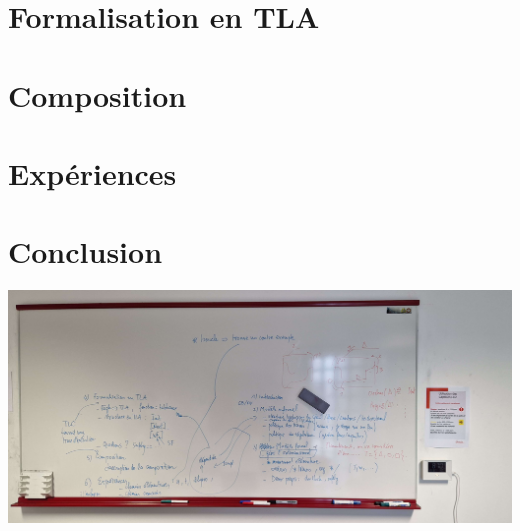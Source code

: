 \documentclass[runningheads]{llncs}
\begin{document}
\section{Formalisation en TLA}
\label{sec:tla-formalisation}

\section{Composition}
\label{sec:composition}

\section{Expériences}
\label{sec:experiments}

\newpage

\section{Conclusion}
\label{sec:conclusion}

\includegraphics[scale=0.1]{img/sommaire_tableau.jpg}




\end{document}
